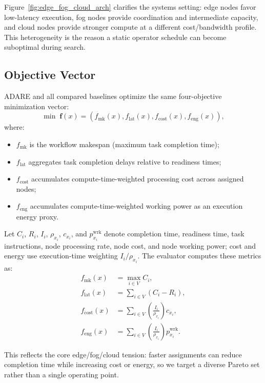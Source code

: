 \documentclass[preprint,12pt]{elsarticle}
\begin{document}
Figure~\ref{fig:edge_fog_cloud_arch} clarifies the systems setting: edge nodes favor low-latency execution, fog nodes provide coordination and intermediate capacity, and cloud nodes provide stronger compute at a different cost/bandwidth profile. This heterogeneity is the reason a static operator schedule can become suboptimal during search.

\subsection{Objective Vector}
ADARE and all compared baselines optimize the same four-objective minimization vector:
\begin{equation}
\min \; \mathbf{f}(x) = \left(f_{\mathrm{mk}}(x), f_{\mathrm{lat}}(x), f_{\mathrm{cost}}(x), f_{\mathrm{eng}}(x)\right),
\end{equation}
where:
\begin{itemize}
    \item $f_{\mathrm{mk}}$ is the workflow makespan (maximum task completion time);
    \item $f_{\mathrm{lat}}$ aggregates task completion delays relative to readiness times;
    \item $f_{\mathrm{cost}}$ accumulates compute-time-weighted processing cost across assigned nodes;
    \item $f_{\mathrm{eng}}$ accumulates compute-time-weighted working power as an execution energy proxy.
\end{itemize}
Let $C_i$, $R_i$, $I_i$, $\rho_{x_i}$, $c_{x_i}$, and $p^{\mathrm{wrk}}_{x_i}$ denote completion time, readiness time, task instructions, node processing rate, node cost, and node working power; cost and energy use execution-time weighting $I_i / \rho_{x_i}$.
The evaluator computes these metrics as:
\begin{equation}
\label{eq:objective_metrics}
\begin{aligned}
f_{\mathrm{mk}}(x) &= \max_{i \in V} C_i, \\
f_{\mathrm{lat}}(x) &= \sum_{i \in V} \left(C_i - R_i\right), \\
f_{\mathrm{cost}}(x) &= \sum_{i \in V} \left(\frac{I_i}{\rho_{x_i}}\right) c_{x_i}, \\
f_{\mathrm{eng}}(x) &= \sum_{i \in V} \left(\frac{I_i}{\rho_{x_i}}\right) p^{\mathrm{wrk}}_{x_i}.
\end{aligned}
\end{equation}

This reflects the core edge/fog/cloud tension: faster assignments can reduce completion time while increasing cost or energy, so we target a diverse Pareto set rather than a single operating point.
\end{document}
